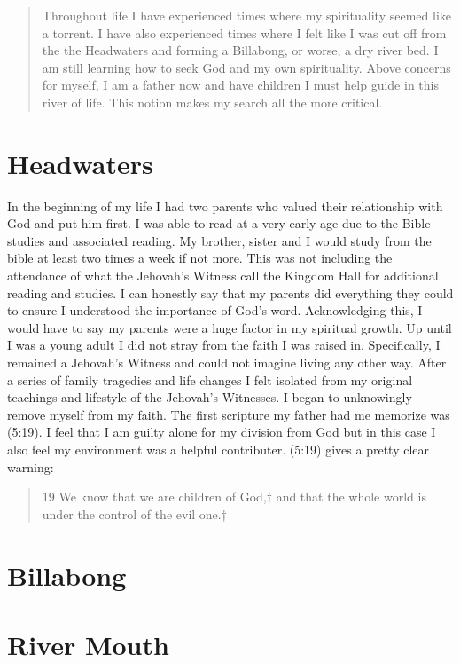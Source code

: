 \documentclass[11pt,a4paper]{scrartcl} %
\begin{document}
    \begin{abstract}
Throughout life I have experienced times where my spirituality seemed like a torrent. I have also experienced times where I felt like I was cut off from the the Headwaters and forming a Billabong, or worse, a dry river bed. I am still learning how to seek God and my own spirituality. Above concerns for myself, I am a father now and have children I must help guide in this river of life. This notion makes my search all the more critical.
    \end{abstract}
       
    \tableofcontents
    
    \section{Headwaters}
\begin{doublespace}
In the beginning of my life I had two parents who valued their relationship with God and put him first. I was able to read at a very early age due to the Bible studies and associated reading. My brother, sister and I would study from the bible at least two times a week if not more. This was not including the attendance of what the Jehovah's Witness call the Kingdom Hall for additional reading and studies. I can honestly say that my parents did everything they could to ensure I understood the importance of God's word. Acknowledging this, I would have to say my parents were a huge factor in my spiritual growth. Up until I was a young adult I did not stray from the faith I was raised in. Specifically, I remained a Jehovah's Witness and could not imagine living any other way. After a series of family tragedies and life changes I felt isolated from my original teachings and lifestyle of the Jehovah's Witnesses.  I began to unknowingly remove myself from my faith. The first scripture my father had me memorize was (5:19). I feel that I am guilty alone for my division from God but in this case I also feel my environment was a helpful contributer. (5:19) gives a pretty clear warning:
\begin{verse}
19 We know that we are children of God,† and that the whole world is under the control of the evil one.† 
\end{verse}
\end{doublespace}
   \section{Billabong}
\begin{doublespace}

\end{doublespace}
    \section{River Mouth}
\clearpage
    \nocite{*}
    
    
\end{document}
